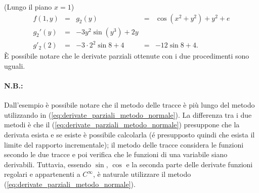 \begin{example}
     (Lungo il piano  $x=1$)
    \begin{equation*}
        \begin{matrix}
            f(1,y) &=& g_2(y) &=& \cos(x^2+y^2)+y^2+e\\
            g_2'(y) &=& -3y^2\sin(y^3)+2y\\
            g'_2(2) &=& -3\cdot 2^2\sin 8+ 4 &=& -12\sin 8+4.
        \end{matrix}
    \end{equation*}
    È possibile notare che le derivate parziali ottenute con i due procedimenti sono uguali.
\end{example}
\paragraph{N.B.:} Dall'esempio è possibile notare che il metodo delle tracce è più lungo del metodo utilizzando in (\ref{eq:derivate_parziali_metodo_normale}). La differenza tra i due metodi è che il (\ref{eq:derivate_parziali_metodo_normale}) presuppone che la derivata esista e se esiste è possibile calcolarla (é presupposto quindi che esista il limite del rapporto incrementale); il metodo delle tracce considera le funzioni secondo le due tracce e poi verifica che le funzioni di una variabile siano derivabili. Tuttavia, essendo $\sin,\, \cos$ e la seconda parte delle derivate funzioni regolari e appartenenti a $C^\infty$,  è naturale utilizzare il metodo (\ref{eq:derivate_parziali_metodo_normale}).

